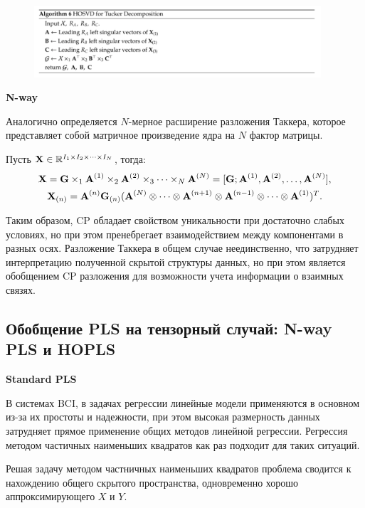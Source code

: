 \begin{figure}[h]
	\centering
	\includegraphics[width=0.95\textwidth]{chapters/varenik2/images/hosvd.png}
\end{figure}
    
\textbf{N-way}

Аналогично определяется $N$-мерное расширение разложения Таккера, которое представляет собой матричное произведение ядра на $N$ фактор матрицы.

Пусть $\textbf{X} \in \mathbb{R}^{I_1\times I_2 \times \dots \times I_N}$, тогда:
\begin{gather*}
    \textbf{X} = \textbf{G} \times_1 \textbf{A}^{(1)} \times_2 \textbf{A}^{(2)} \times_3 \dots \times_N \textbf{A}^{(N)} = [\textbf{G}; \textbf{A}^{(1)}, \textbf{A}^{(2)}, \dots, \textbf{A}^{(N)}],\\
    \textbf{X}_{(n)} = \textbf{A}^{(n)} \textbf{G}_{(n)} (\textbf{A}^{(N)} \otimes \dots \otimes \textbf{A}^{(n+1)} \otimes \textbf{A}^{(n-1)}\otimes \dots \otimes \textbf{A}^{(1)})^T.
\end{gather*}


Таким образом, CP обладает свойством уникальности при достаточно слабых условиях, но при этом пренебрегает взаимодействием между компонентами в разных осях.
Разложение Таккера в общем случае неединственно, что затрудняет интерпретацию полученной скрытой структуры данных, но при этом является обобщением CP разложения для возможности учета информации о взаимных связях.
    
\subsection{Обобщение PLS на тензорный случай: N-way PLS и HOPLS}

\textbf{Standard PLS}

В системах BCI, в задачах регрессии линейные модели применяются в основном из-за их простоты и надежности, при этом высокая размерность данных затрудняет прямое применение общих методов линейной регрессии. Регрессия методом частичных наименьших квадратов как раз подходит для таких ситуаций.

Решая задачу методом частничных наименьших квадратов проблема сводится к нахождению общего скрытого пространства, одновременно хорошо аппроксимирующего $X$ и $Y$.

